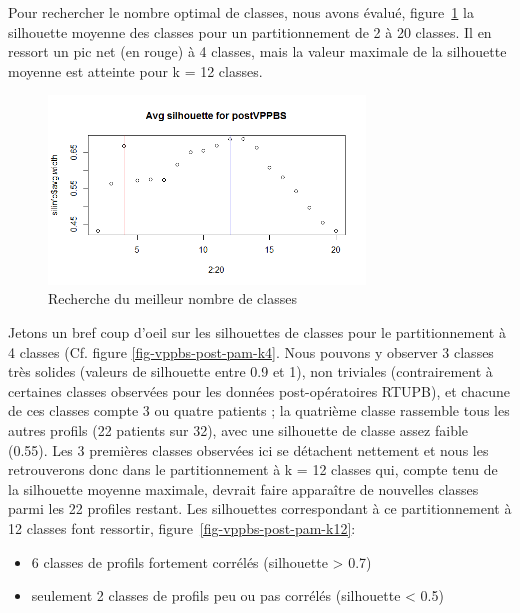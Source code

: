 %
%

Pour rechercher le nombre optimal de classes, nous avons évalué, figure~\ref{fig-vppbs-post-elbow} la silhouette moyenne des classes pour un partitionnement de 2 à 20 classes. Il en ressort un pic net (en rouge) à 4 classes, mais la valeur maximale de la silhouette moyenne est atteinte pour k = 12 classes.

\begin{figure}[H]
\centering
\includegraphics[width=0.75\textwidth]{../Fig/VPPBS/vppbs-elbow-post.png}
\caption{Recherche du meilleur nombre de classes}
\label{fig-vppbs-post-elbow}
\end{figure}

Jetons un bref coup d'oeil sur les silhouettes de classes pour le partitionnement à 4 classes (Cf. figure \ref{fig-vppbs-post-pam-k4}. Nous pouvons y observer 3 classes très solides (valeurs de silhouette entre 0.9 et 1), non triviales (contrairement à certaines classes observées pour les données post-opératoires RTUPB), et chacune de ces classes compte 3 ou quatre patients ; la quatrième classe rassemble tous les autres profils (22 patients sur 32), avec une silhouette de classe assez faible (0.55). Les 3 premières classes observées ici se détachent nettement et nous les retrouverons donc dans le partitionnement à k = 12 classes qui, compte tenu de la silhouette moyenne maximale, devrait faire apparaître de nouvelles classes parmi les 22 profiles restant. Les silhouettes correspondant à ce partitionnement à 12 classes font ressortir, figure~\ref{fig-vppbs-post-pam-k12}:
\begin{itemize}
\item 6 classes de profils fortement corrélés (silhouette > 0.7)
\item seulement 2 classes de profils peu ou pas corrélés (silhouette < 0.5)
\end{itemize}

